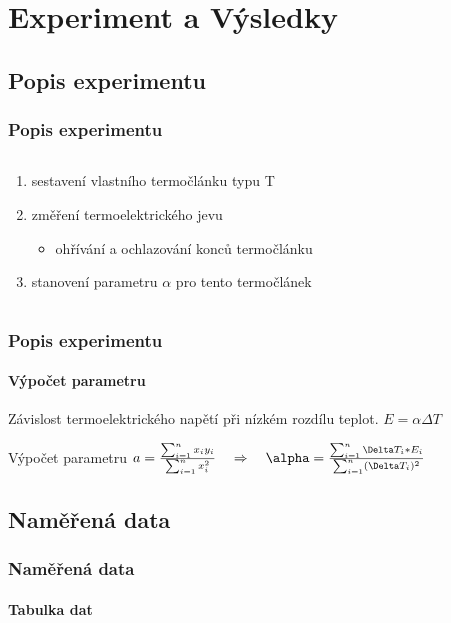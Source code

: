 \documentclass[smaller,aspectratio=1610,handout]{beamer}
\newcommand\sumi{\sum_{i=1}^n}
\begin{document}
\section{Experiment a Výsledky}

\subsection{Popis experimentu}
\begin{frame}
	\frametitle{Popis experimentu}
	\begin{columns}
		\begin{column}{0.5\textwidth}
			\begin{enumerate}
				\item sestavení vlastního termočlánku typu T
				\item změření termoelektrického jevu
					\begin{itemize}
						\item ohřívání a ochlazování konců termočlánku
					\end{itemize}
				\item stanovení parametru $\alpha$ pro tento termočlánek
			\end{enumerate}
		\end{column}
		\begin{column}{0.5\textwidth}
		\end{column}
	\end{columns}
\end{frame}

\begin{frame}
	\frametitle{Popis experimentu}
	\framesubtitle{Výpočet parametru}
	\begin{block}{Závislost termoelektrického napětí při nízkém rozdílu teplot.}
		\centering $E=\alpha\Delta T$
	\end{block}
	\begin{block}{Výpočet parametru}
		\centering $a=\frac{\sumi x_iy_i}{\sumi x_i^2}
		\ztoho \alpha=\frac{\sumi\Delta T_i*E_i}{\sumi (\Delta T_i)^2}$
	\end{block}
\end{frame}

\subsection{Naměřená data}
\begin{frame}
	\frametitle{Naměřená data}
	\framesubtitle{Tabulka dat}
	\hspace{0cm}\vfill
	\footnotesize
	
	\vfill
\end{frame}
\end{document}
